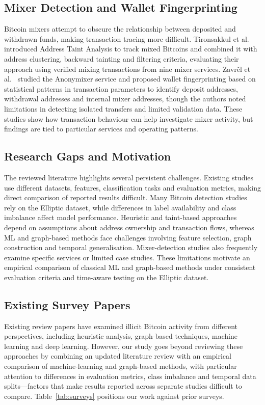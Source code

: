 \documentclass[conference]{IEEEtran}
\begin{document}
\subsection{Mixer Detection and Wallet Fingerprinting}

Bitcoin mixers attempt to obscure the relationship between deposited and
withdrawn funds, making transaction tracing more difficult.
Tironsakkul et al.~\cite{tironsakkul2020tracking} introduced Address Taint
Analysis to track mixed Bitcoins and combined it with address clustering,
backward tainting and filtering criteria, evaluating their approach using
verified mixing transactions from nine mixer services.
Zavr{\v{e}}l et al.~\cite{zavrel2025tumbling} studied the Anonymixer
service and proposed wallet fingerprinting based on statistical patterns in
transaction parameters to identify deposit addresses, withdrawal addresses
and internal mixer addresses, though the authors noted limitations in
detecting isolated transfers and limited validation data.
These studies show how transaction behaviour can help investigate mixer
activity, but findings are tied to particular services and operating patterns.

\subsection{Research Gaps and Motivation}

The reviewed literature highlights several persistent challenges.
Existing studies use different datasets, features, classification tasks and
evaluation metrics, making direct comparison of reported results difficult.
Many Bitcoin detection studies rely on the Elliptic dataset, while differences
in label availability and class imbalance affect model performance.
Heuristic and taint-based approaches depend on assumptions about address
ownership and transaction flows, whereas ML and graph-based methods face
challenges involving feature selection, graph construction and temporal
generalisation.
Mixer-detection studies also frequently examine specific services or limited
case studies.
These limitations motivate an empirical comparison of classical ML and
graph-based methods under consistent evaluation criteria and time-aware
testing on the Elliptic dataset.

\subsection{Existing Survey Papers}

Existing review papers have examined illicit Bitcoin activity from different
perspectives, including heuristic analysis, graph-based techniques, machine
learning and deep learning.
However, our study goes beyond reviewing these approaches by combining an
updated literature review with an empirical comparison of machine-learning
and graph-based methods, with particular attention to differences in
evaluation metrics, class imbalance and temporal data splits---factors that
make results reported across separate studies difficult to compare.
Table~\ref{tab:surveys} positions our work against prior surveys.
\end{document}
